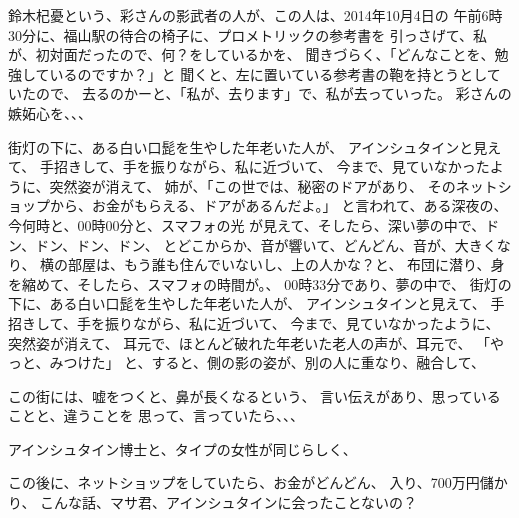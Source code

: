 \documentclass{jsarticle}
\begin{document}
\title{}
\author{}
\date{}
\maketitle

   鈴木杞憂という、彩さんの影武者の人が、この人は、2014年10月4日の
   午前6時30分に、福山駅の待合の椅子に、プロメトリックの参考書を
   引っさげて、私が、初対面だったので、何？をしているかを、
   聞きづらく、「どんなことを、勉強しているのですか？」と
   聞くと、左に置いている参考書の鞄を持とうとしていたので、
   去るのかーと、「私が、去ります」で、私が去っていった。
   彩さんの嫉妬心を、、、

   街灯の下に、ある白い口髭を生やした年老いた人が、
   アインシュタインと見えて、
   手招きして、手を振りながら、私に近づいて、
   今まで、見ていなかったように、突然姿が消えて、
   姉が、「この世では、秘密のドアがあり、
   そのネットショップから、お金がもらえる、ドアがあるんだよ。」
   と言われて、ある深夜の、今何時と、00時00分と、スマフォの光
   が見えて、そしたら、深い夢の中で、ドン、ドン、ドン、ドン、
   とどこからか、音が響いて、どんどん、音が、大きくなり、
   横の部屋は、もう誰も住んでいないし、上の人かな？と、
   布団に潜り、身を縮めて、そしたら、スマフォの時間が。、
   00時33分であり、夢の中で、
   街灯の下に、ある白い口髭を生やした年老いた人が、
   アインシュタインと見えて、
   手招きして、手を振りながら、私に近づいて、
   今まで、見ていなかったように、突然姿が消えて、
   耳元で、ほとんど破れた年老いた老人の声が、耳元で、
   「やっと、みつけた」
   と、すると、側の影の姿が、別の人に重なり、融合して、

   この街には、嘘をつくと、鼻が長くなるという、
   言い伝えがあり、思っていることと、違うことを
   思って、言っていたら、、、

   アインシュタイン博士と、タイプの女性が同じらしく、

   この後に、ネットショップをしていたら、お金がどんどん、
   入り、700万円儲かり、
   こんな話、マサ君、アインシュタインに会ったことないの？
\end{document}
